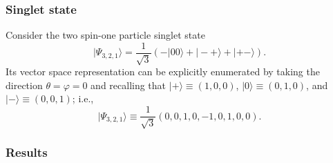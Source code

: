 \documentclass[fleqn,twoside]{article}      %
\begin{document}
\subsubsection*{Singlet state}

Consider the two spin-one particle singlet state
\begin{equation}
\label{2009-gtq-s1}
\vert \Psi_{3,2,1} \rangle  =  \frac{1}{\sqrt{3}}\left(-|00\rangle + |-+\rangle + |+-\rangle \right)
.
\end{equation}
Its vector space representation can be explicitly enumerated by taking the direction $\theta =\varphi =0$ and recalling that
$\vert +\rangle \equiv (1,0,0)$,
$\vert 0\rangle \equiv (0,1,0)$, and
$\vert -\rangle \equiv (0,0,1)$; i.e.,
\begin{equation}
\label{2009-gtq-s1ef}
\vert \Psi_{3,2,1} \rangle  \equiv  \frac{1}{\sqrt{3}}\left(0,0,1,0,-1,0,1,0,0 \right)
.
\end{equation}

\subsubsection*{Results}
\end{document}
